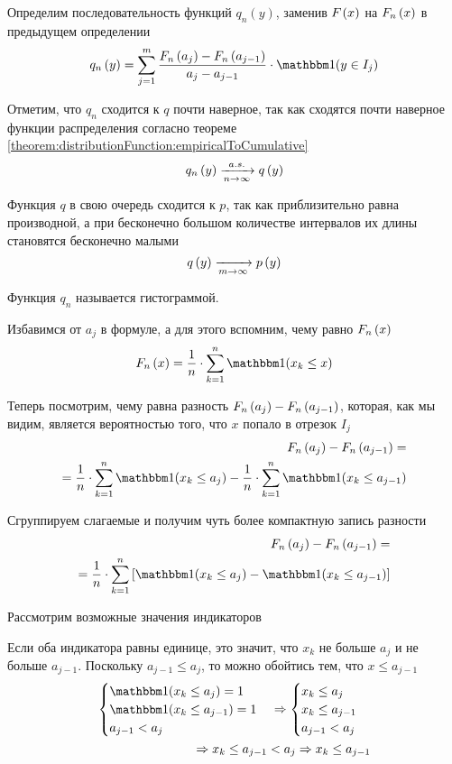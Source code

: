 Определим последовательность функций $q_n\left(y\right)$,
заменив $F_{}\left(x\right)$ на $F_n\left(x\right)$ в предыдущем определении
\begin{equation}\label{eq:histogram_start}
q_n\left(y\right)
=\sum_{j=1}^m \frac{\cdfn{a_j}-\cdfn{a_{j-1}}}{a_j-a_{j-1}}
    \cdot\indicator{y\in I_j}
\end{equation}

Отметим, что $q_n$ сходится к $q$ почти наверное, так как сходятся почти
наверное функции распределения согласно теореме
\ref{theorem:distributionFunction:empiricalToCumulative}
$$q_n\left(y\right)\xrightarrow[n\to\infty]{a.s.} q\left(y\right)$$

Функция $q$ в свою очередь сходится к $p$, так как приблизительно равна
производной, а при бесконечно большом количестве интервалов их длины
становятся бесконечно малыми
$$q\left(y\right)\xrightarrow[m\to\infty]{}p\left(y\right)$$

Функция $q_n$ называется гистограммой.

Избавимся от $a_j$ в формуле, а для этого вспомним, чему равно $F_n\left(x\right)$
$$\cdfn{x}=\frac{1}{n}\cdot \sum_{k=1}^n
\indicator{x_k\le x}$$

Теперь посмотрим, чему равна разность $F_n\left(a_j\right)-F_n\left(a_{j-1}\right)$,
которая, как мы видим, является вероятностью того,
что $x$ попало в отрезок $I_j$
\begin{align*}
    \cdfn{a_j}-\cdfn{a_{j-1}}=\\
    =\frac{1}{n}\cdot \sum_{k=1}^n
        \indicator{x_k\le a_j}-\frac{1}{n}\cdot \sum_{k=1}^n
        \indicator{x_k\le a_{j-1}}
\end{align*}

Сгруппируем слагаемые и получим чуть более компактную запись разности
\begin{eqnarray}\label{eq:cdfn_difference}
    \cdfn{a_j}-\cdfn{a_{j-1}}=\nonumber\\
    =\frac{1}{n}\cdot \sum_{k=1}^n
        \left[\indicator{x_k\le a_j}-\indicator{x_k\le a_{j-1}}\right]
\end{eqnarray}

Рассмотрим возможные значения индикаторов

Если оба индикатора равны единице,
это значит, что $x_k$ не больше $a_j$ и не больше $a_{j-1}$.
Поскольку $a_{j-1}\le a_j$, то можно обойтись тем, что $x\le a_{j-1}$
\begin{align*}
    \begin{cases}
        \indicator{x_k\le a_j}=1\\
        \indicator{x_k\le a_{j-1}}=1\\
        a_{j-1} < a_j
    \end{cases}
    \Rightarrow
    \begin{cases}
        x_k\le a_j\\
        x_k\le a_{j-1}\\
        a_{j-1} < a_j
    \end{cases}
    \\\Rightarrow
        x_k\le a_{j-1} < a_j
    \Rightarrow
        x_k\le a_{j-1}
\end{align*}

